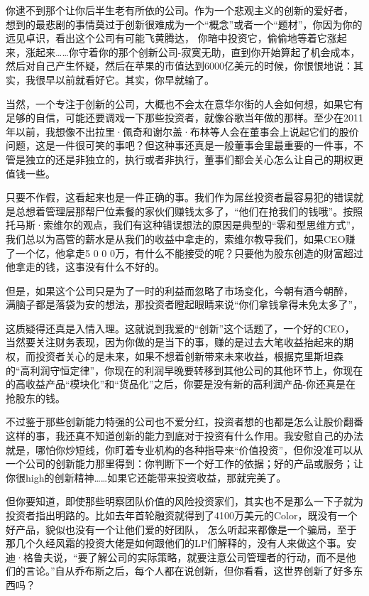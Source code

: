 你逮不到那个让你后半生老有所依的公司。作为一个悲观主义的创新的爱好者，
想到的最悲剧的事情莫过于创新很难成为一个``概念''或者一个``题材''，你因为你的远见卓识，看出这个公司有可能飞黄腾达，
你暗中投资它，偷偷地等着它涨起来，涨起来\ldots{}\ldots{}你守着你的那个创新公司-寂寞无助，直到你开始算起了机会成本，然后对自己产生怀疑，然后在苹果的市值达到6000亿美元的时候，你恨恨地说：其实，我很早以前就看好它。其实，你早就输了。

当然，一个专注于创新的公司，大概也不会太在意华尔街的人会如何想，如果它有足够的自信，可能还要调戏一下那些投资者，就像谷歌当年做的那样。至少在2011年以前，我想像不出拉里·佩奇和谢尔盖·布林等人会在董事会上说起它们的股价问题，这是一件很可笑的事吧？但这种事还真是一般董事会里最重要的一件事，不管是独立的还是非独立的，执行或者非执行，董事们都会关心怎么让自己的期权更值钱一些。

只要不作假，这看起来也是一件正确的事。我们作为屌丝投资者最容易犯的错误就是总想着管理层那帮尸位素餐的家伙们赚钱太多了，``他们在抢我们的钱哦''。按照托马斯·索维尔的观点，我们有这种错误想法的原因是典型的``零和型思维方式''，
我们总以为高管的薪水是从我们的收益中拿走的，索维尔教导我们，如果CEO赚了一个亿，他拿走5
0 0
0万，有什么不能接受的呢？只要他为股东创造的财富超过他拿走的钱，这事没有什么不好的。

但是，如果这个公司只是为了一时的利益而忽略了市场变化，今朝有酒今朝醉，
满脑子都是落袋为安的想法，那投资者瞪起眼睛来说``你们拿钱拿得未免太多了''，

这质疑得还真是入情入理。这就说到我爱的``创新''这个话题了，一个好的CEO，当然要关注财务表现，因为你做的是当下的事，赚的是过去大笔收益抬起来的期权，而投资者关心的是未来，如果不想着创新带来未来收益，根据克里斯坦森的``高利润守恒定律''，你现在的利润早晚要转移到其他公司的其他环节上，你现在的高收益产品``模块化''和``货品化''之后，你要是没有新的高利润产品-你还真是在抢股东的钱。

不过鉴于那些创新能力特强的公司也不爱分红，投资者想的也都是怎么让股价翻番这样的事，我还真不知道创新的能力到底对于投资有什么作用。我安慰自己的办法就是，哪怕你炒短线，你盯着专业机构的各种指导来``价值投资''，但你没准可以从一个公司的创新能力那里得到：你判断下一个好工作的依据；好的产品或服务；让你很high的创新精神\ldots{}\ldots{}如果它还能带来投资收益，那就完美了。

但你要知道，即使那些明察团队价值的风险投资家们，其实也不是那么一下子就为投资者指出明路的。比如去年首轮融资就得到了4100万美元的Color，既没有一个好产品，貌似也没有一个让他们爱的好团队，
怎么听起来都像是一个骗局，至于那几个久经风霜的投资大佬是如何跟他们的LP们解释的，没有人来做这个事。安迪·格鲁夫说，``要了解公司的实际策略，就要注意公司管理者的行动，而不是他们的言论。''自从乔布斯之后，每个人都在说创新，但你看看，这世界创新了好多东西吗？

